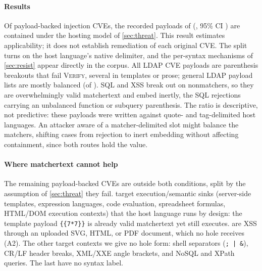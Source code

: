 \paragraph{Results}
Of \dataPayloadBackedCVEs payload-backed injection CVEs, the recorded
payloads of \textbf{\dataContained} (\textbf{\dataContainedShare}, 95\% CI
\dataContainedInterval) are contained
under the hosting model of \cref{sec:threat}.
This result estimates applicability;
it does not establish remediation of each original CVE.
The split turns on the host language's native delimiter, and the per-syntax
mechanisms of \cref{sec:resist} appear directly in the corpus. All \dataLdapRejected LDAP CVE
payloads are parenthesis breakouts that fail \textsc{Verify}, several in templates
or prose; general LDAP payload lists are mostly balanced
(\dataLdapCorpusInert of \dataLdapCorpus). SQL and XSS break out on nonmatchers, so they are overwhelmingly valid
matchertext and embed inertly, the \dataSqlRejected SQL rejections carrying an
unbalanced function or subquery parenthesis.
The ratio is descriptive, not predictive: these payloads were written against
quote- and tag-delimited host languages.
An attacker aware of a matcher-delimited slot might balance the matchers,
shifting cases from rejection to inert embedding
without affecting containment, since both routes hold the value.

\paragraph{Where matchertext cannot help}
The remaining \dataOutsideCVEs payload-backed CVEs are outside both conditions,
split by the assumption of \cref{sec:threat} they fail. \dataOutsideSemantic target
execution/semantic sinks (server-side templates, expression languages, code
evaluation, spreadsheet formulas, HTML/DOM execution contexts) that the host language
runs by design: the template payload \verb|{{7*7}}| is already valid matchertext
yet still executes. \dataOutsideDocument are XSS through an uploaded SVG, HTML,
or PDF document, which no hole receives (A2). The other \dataOutsideNonmatcher target contexts we
give no hole form: shell separators (\verb|;|~\verb-|-~\verb|&|), CR/LF header
breaks, XML/XXE angle brackets, and NoSQL and XPath queries. The last
\dataOutsideUnknown have no syntax label.

